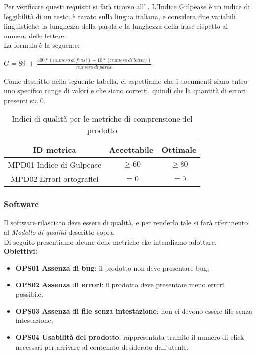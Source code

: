 \documentclass[../piano_di_qualifica.tex]{subfiles}
\begin{document}
Per verificare questi requisiti si farà ricorso all’ . L'Indice Gulpease è un indice di leggibilità di un testo, è tarato sulla lingua italiana, e considera due variabili linguistiche: la lunghezza della parola e la lunghezza della frase rispetto al numero delle lettere.\\
La formula è la seguente:\par
\begin{center}
	$G = 89\ +\ \frac{300 * (numero\ di\ frasi) - 10 * (numero\ di\ lettere)}{numero\ di\ parole} $
\end{center}
Come descritto nella seguente tabella, ci aspettiamo che i documenti siano entro uno specifico range di valori e che siano corretti, quindi che la quantità di errori presenti sia 0. \par

\begin{table}[!ht]
	\centering
	\begin{tabular}{|c|c|c|}
		\hline
		\rowcolor{lightgray}
		\textbf{ID metrica}      & \textbf{Accettabile} & \textbf{ Ottimale} \\
		\hline
		MPD01 Indice di Gulpease & \(\ge 60\)                  & \(\ge 80\)                  \\
		MPD02 Errori ortografici & \(= 0\)                     & \(= 0\)                     \\
		\hline
	\end{tabular}
	\caption{Indici di qualità per le metriche di comprensione del prodotto}
\end{table}

\subsubsection{Software}
Il software rilasciato deve essere di qualità, e per renderlo tale si farà riferimento al \emph{Modello di qualità} descritto sopra. \\
Di seguito presentiamo alcune delle metriche che intendiamo adottare. \\


\smallbreak
\textbf{Obiettivi:}
\smallbreak
\begin{itemize}
	\item \textbf{OPS01 Assenza di bug}: il prodotto non deve presentare bug;
	\item \textbf{OPS02 Assenza di errori}: il prodotto deve presentare meno errori possibile;
	\item \textbf{OPS03 Assenza di file senza intestazione}: non ci devono essere file senza intestazione;
	\item \textbf{OPS04 Usabilità del prodotto}: rappresentata tramite il numero di click necessari per arrivare al contenuto desiderato dall'utente.
\end{itemize}
\end{document}
